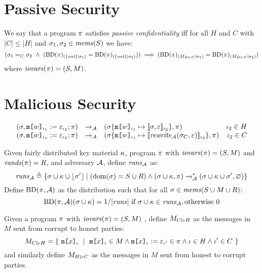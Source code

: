 \section{Passive Security}

\begin{definition}
  \label{definition-NIMO}
  We say that a program $\pi$ satisfies \emph{passive confidentiality}
  iff for all $H$ and $C$ with $|C|\le|H|$ and 
  $\sigma_1,\sigma_2 \in \mathit{mems}(S)$ we have:
  $$
  (\store_1 =_C \store_2 \ \wedge \ 
  (\condd{\progtt(\prog)}{\{ \outv \}}{\store_1} = \condd{\progtt(\prog)}{\{ \outv \}}{\store_2}))
  \implies 
  (\condd{\progtt(\prog)}{\houtputs}{\store_1} = \condd{\progtt(\prog)}{\houtputs}{\store_2})
  $$
  where $\mathit{iovars}(\pi) = (S,M)$.
\end{definition}

\section{Malicious Security}

$$
\begin{array}{rclr}
  (\sigma, \texttt{m[}w\texttt{]}_{\iota_1} := \varepsilon_{\iota_2};\pi) &\xrightarrow{}_{\mathcal{A}}&
  (\sigma\{\texttt{m[}w\texttt{]}_{\iota_1} \mapsto \llbracket \sigma,\varepsilon \rrbracket_{\iota_2}\}, \pi) & \iota_2 \in H\\
  (\sigma, \texttt{m[}w\texttt{]}_{\iota_1} := \varepsilon_{\iota_2};\pi) &\xrightarrow{}_{\mathcal{A}}&
  (\sigma\{\texttt{m[}w\texttt{]}_{\iota_1} \mapsto \llbracket \mathit{rewrite}_{\mathcal{A}}(\sigma_C,\varepsilon) \rrbracket_{\iota_2}\}, \pi) & \iota_2 \in C
\end{array}
$$

\begin{definition}
  \label{def-progtt}
  \label{definition-progtt}
  Given fairly distributed key material $\kappa$, program $\pi$ with $\mathit{iovars}(\pi) = (S,M)$ and $\mathit{rands}(\pi) = R$,
  and adversary $\mathcal{A}$, define $\mathit{runs}_{\mathcal{A}}$ as:
  $$
  \mathit{runs}_{\mathcal{A}} \triangleq \{ \sigma \cup \kappa \cup \lfloor \sigma' \rfloor \mid (\mathrm{dom}(\sigma) = S \cup R) \wedge (\sigma \cup \kappa,\pi) \xrightarrow{}^{*}_{\mathcal{A}}
  (\sigma \cup \kappa \cup \sigma',\varnothing) \}
  $$
  Define $\mathrm{BD}(\pi, \mathcal{A})$ as the distribution such that for all
  $\sigma \in \mathit{mems}(S \cup M \cup R)$:
  $$
  \mathrm{BD}(\pi,\mathcal{A})(\sigma \cup \kappa) =  1 / |\mathit{runs}| \ \text{if}\ \sigma \cup \kappa \in \mathit{runs}_{\mathcal{A}}, \text{otherwise}\ 0
  $$
\end{definition}

\begin{definition}
  Given a program $\pi$ with $\mathit{iovars}(\pi) = (S,M)$ , define $M_{C \rhd H}$ as the
  messages in $M$ sent from corrupt to honest parties:
  $$
  \cinputs = \{\ \elab{\mesg{x}}{\cid}\ \mid\  \elab{\mesg{x}}{\cid} \in M \wedge \eassign{\mesg{x}}{\cid}{\be}{\cid'} \in \prog
  \wedge \cid \in H \wedge \cid' \in C \ \} 
  $$
  and similarly define $M_{H \rhd C}$ as the messages in $M$ sent from honest to corrupt parties.
\end{definition}

